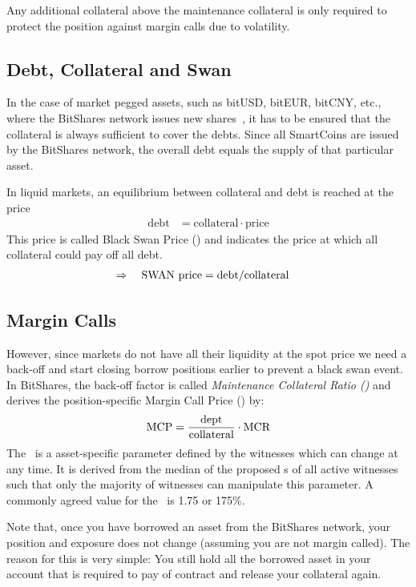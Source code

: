 Any additional collateral above the maintenance collateral is only required to
protect the position against margin calls due to volatility.

\subsection{Debt, Collateral and Swan}

In the case of market pegged assets, such as bitUSD, bitEUR, bitCNY, etc.,
where the BitShares network issues new shares~\cite{bts:financial}, it has to
be ensured that the collateral is always sufficient to cover the debts. Since
all SmartCoins are issued by the BitShares network, the overall debt equals the
supply of that particular asset.

In liquid markets, an equilibrium between collateral and debt is reached at the
price
\begin{align}
 \text{debt} &= \text{collateral} \cdot \text{price}
\end{align}
This price is called Black Swan Price (\SWAN) and indicates the price at which
all collateral could pay off all debt.
\begin{align}
 \Rightarrow\quad\text{\text{SWAN}\ price} &= \text{debt} / \text{collateral}
\end{align}

\subsection{Margin Calls}

However, since markets do not have all their liquidity at the spot price we
need a back-off and start closing borrow positions earlier to prevent a black
swan event. In BitShares, the back-off factor is called \emph{Maintenance
Collateral Ratio (\MCR)} and derives the position-specific Margin Call Price
(\MCP) by:
\begin{align}
 \text{MCP} = \frac{\text{dept}}{\text{collateral}} \cdot \text{MCR}
\end{align}
The \MCR\ is a asset-specific parameter defined by the witnesses which can
change at any time.  It is derived from the median of the proposed \MCR s of
all active witnesses such that only the majority of witnesses can manipulate
this parameter. A commonly agreed value for the \MCR\ is \num{1.75} or 175\%.

Note that, once you have borrowed an asset from the BitShares network, your
position and exposure does not change (assuming you are not margin called). The
reason for this is very simple: You still hold all the borrowed asset in your
account that is required to pay of contract and release your collateral again.

